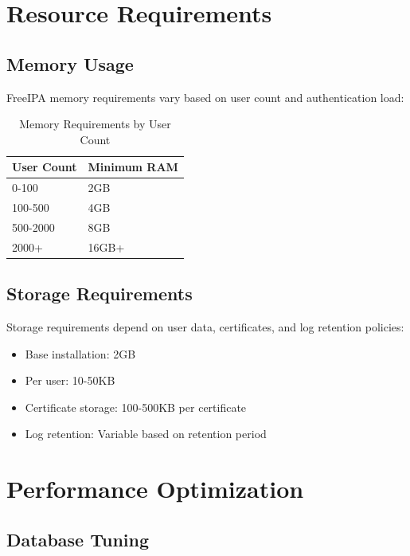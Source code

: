 \documentclass[12pt,a4paper]{report}
\begin{document}
\section{Resource Requirements}

\subsection{Memory Usage}

FreeIPA memory requirements vary based on user count and authentication load:

\begin{table}[H]
    \centering
    \caption{Memory Requirements by User Count}
    \label{tab:memory}
    \begin{tabular}{ll}
        \toprule
        \textbf{User Count} & \textbf{Minimum RAM} \\
        \midrule
        0-100 & 2GB \\
        100-500 & 4GB \\
        500-2000 & 8GB \\
        2000+ & 16GB+ \\
        \bottomrule
    \end{tabular}
\end{table}

\subsection{Storage Requirements}

Storage requirements depend on user data, certificates, and log retention policies:

\begin{itemize}
    \item Base installation: 2GB
    \item Per user: 10-50KB
    \item Certificate storage: 100-500KB per certificate
    \item Log retention: Variable based on retention period
\end{itemize}

\section{Performance Optimization}

\subsection{Database Tuning}
\end{document}
